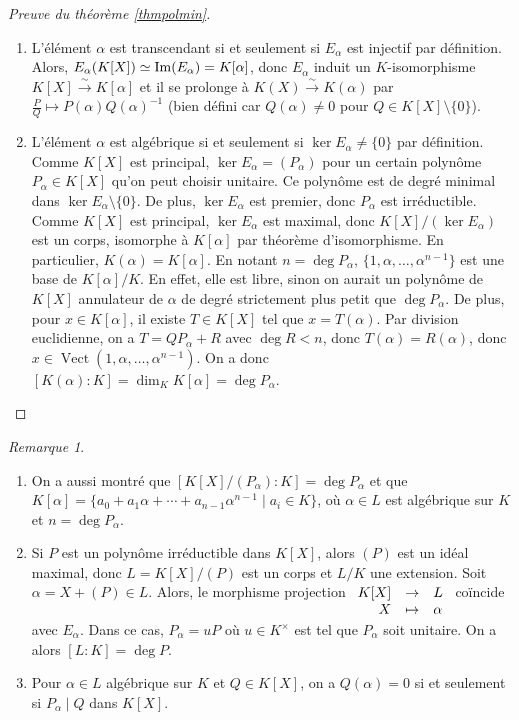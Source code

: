 \documentclass{article}
\DeclareMathOperator{\Vect}{Vect}
\renewcommand{\Im}{\mathop{\rm Im}}
\newcommand{\applic}[4]{\begin{array}[t]{rcl}
#1 & \to & #2 \\
#3 & \mapsto & #4
\end{array}}
\theoremstyle{plain}
\theoremstyle{definition}
\theoremstyle{remark}
\newtheorem*{remark}{Remarque}
\begin{document}
\begin{proof}[Preuve du théorème \ref{thmpolmin}] \leavevmode
    \begin{enumerate}
        \item L'élément $\alpha$ est transcendant si et seulement si $E_\alpha$ est injectif par définition. Alors, $E_\alpha (K[X]) \simeq \Im(E_\alpha) = K[\alpha]$, donc $E_\alpha$ induit un $K$-isomorphisme $K[X] \xrightarrow{\sim} K[\alpha]$ et il se prolonge à $K(X) \xrightarrow{\sim} K(\alpha)$ par $\frac{P}{Q} \mapsto P(\alpha)Q(\alpha)^{-1}$ (bien défini car $Q(\alpha) \ne 0$ pour $Q \in K[X]\setminus\{0\}$).
        \item L'élément $\alpha$ est algébrique si et seulement si $\ker E_\alpha \ne \{0\}$ par définition. Comme $K[X]$ est principal, $\ker E_\alpha = (P_\alpha)$ pour un certain polynôme $P_\alpha \in K[X]$ qu'on peut choisir unitaire. Ce polynôme est de degré minimal dans $\ker E_\alpha \setminus \{0\}$. De plus, $\ker E_\alpha$ est premier, donc $P_\alpha$ est irréductible. Comme $K[X]$ est principal, $\ker E_\alpha$ est maximal, donc $K[X]/(\ker E_\alpha)$ est un corps, isomorphe à $K[\alpha]$ par théorème d'isomorphisme. En particulier, $K(\alpha) = K[\alpha]$. En notant $n = \deg P_\alpha$, $\{1,\alpha,\dots,\alpha^{n-1}\}$ est une base de $K[\alpha]/K$. En effet, elle est libre, sinon on aurait un polynôme de $K[X]$ annulateur de $\alpha$ de degré strictement plus petit que $\deg P_\alpha$. De plus, pour $x \in K[\alpha]$, il existe $T \in K[X]$ tel que $x = T(\alpha)$. Par division euclidienne, on a $T = QP_\alpha + R$ avec $\deg R < n$, donc $T(\alpha) = R(\alpha)$, donc $x \in \Vect(1,\alpha,\dots,\alpha^{n-1})$. On a donc $[K(\alpha) : K] = \dim_K K[\alpha] = \deg P_\alpha$.
    \end{enumerate}
\end{proof}

\begin{remark} \leavevmode
    \begin{enumerate}
        \item On a aussi montré que $[K[X]/(P_\alpha) : K] = \deg P_\alpha$ et que $K[\alpha] = \{a_0 + a_1 \alpha + \cdots + a_{n-1}\alpha^{n-1} \mid a_i \in K\}$, où $\alpha \in L$ est algébrique sur $K$ et $n = \deg P_\alpha$.
        \item Si $P$ est un polynôme irréductible dans $K[X]$, alors $(P)$ est un idéal maximal, donc $L = K[X]/(P)$ est un corps et $L/K$ une extension. Soit $\alpha = X + (P) \in L$. Alors, le morphisme projection $\applic{K[X]}{L}{X}{\alpha}$ coïncide avec $E_\alpha$. Dans ce cas, $P_\alpha = uP$ où $u \in K^\times$ est tel que $P_\alpha$ soit unitaire. On a alors $[L : K] = \deg P$.
        \item Pour $\alpha \in L$ algébrique sur $K$ et $Q \in K[X]$, on a $Q(\alpha) = 0$ si et seulement si $P_\alpha \mid Q$ dans $K[X]$.
    \end{enumerate}
\end{remark}
\end{document}
